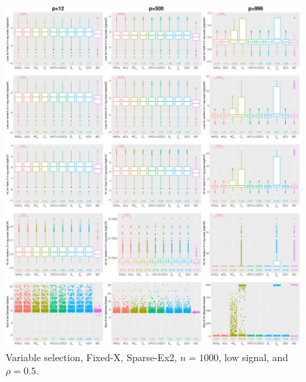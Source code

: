 \begin{figure}[!ht]
\centering
\includegraphics[width=\textwidth]{figures/supplement/fixedx/subset_selection/Sparse-Ex2_n1000_lsnr_rho05.eps}
\caption{Variable selection, Fixed-X, Sparse-Ex2, $n=1000$, low signal, and $\rho=0.5$.}
\end{figure}
\clearpage
